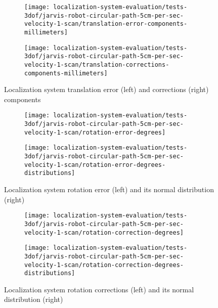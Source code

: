 \begin{figure}[ht]
	\centering
	\begin{subfigure}[h]{.497\textwidth}
		\centering
		\texttt{[image: localization-system-evaluation/tests-3dof/jarvis-robot-circular-path-5cm-per-sec-velocity-1-scan/translation-error-components-millimeters]}
	\end{subfigure}
	\begin{subfigure}[h]{.497\textwidth}
		\centering
		\texttt{[image: localization-system-evaluation/tests-3dof/jarvis-robot-circular-path-5cm-per-sec-velocity-1-scan/translation-corrections-components-millimeters]}
	\end{subfigure}
	\caption{Localization system translation error (left) and corrections (right) components}
	\label{fig:localization-system-evaluation_jarvis-robot-circular-path-5cm-per-sec-velocity-1-scan_translation-errors-components}
\end{figure}

\begin{figure}[ht]
	\centering
	\begin{subfigure}[h]{.497\textwidth}
		\centering
		\texttt{[image: localization-system-evaluation/tests-3dof/jarvis-robot-circular-path-5cm-per-sec-velocity-1-scan/rotation-error-degrees]}
	\end{subfigure}
	\begin{subfigure}[h]{.497\textwidth}
		\centering
		\texttt{[image: localization-system-evaluation/tests-3dof/jarvis-robot-circular-path-5cm-per-sec-velocity-1-scan/rotation-error-degrees-distributions]}
	\end{subfigure}
	\caption{Localization system rotation error (left) and its normal distribution (right)}
	\label{fig:localization-system-evaluation_jarvis-robot-circular-path-5cm-per-sec-velocity-1-scan_rotation-errors}
\end{figure}

\begin{figure}[ht]
	\centering
	\begin{subfigure}[h]{.497\textwidth}
		\centering
		\texttt{[image: localization-system-evaluation/tests-3dof/jarvis-robot-circular-path-5cm-per-sec-velocity-1-scan/rotation-correction-degrees]}
	\end{subfigure}
	\begin{subfigure}[h]{.497\textwidth}
		\centering
		\texttt{[image: localization-system-evaluation/tests-3dof/jarvis-robot-circular-path-5cm-per-sec-velocity-1-scan/rotation-correction-degrees-distributions]}
	\end{subfigure}
	\caption{Localization system rotation corrections (left) and its normal distribution (right)}
	\label{fig:localization-system-evaluation_jarvis-robot-circular-path-5cm-per-sec-velocity-1-scan_rotation-errors-corrections}
\end{figure}

